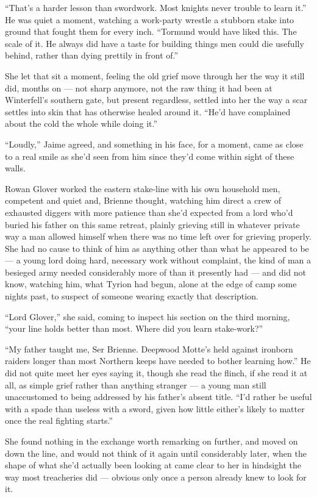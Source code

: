 “That’s a harder lesson than swordwork. Most knights never trouble to learn it.” He was quiet a moment, watching a work-party wrestle a stubborn stake into ground that fought them for every inch. “Tormund would have liked this. The scale of it. He always did have a taste for building things men could die usefully behind, rather than dying prettily in front of.”

She let that sit a moment, feeling the old grief move through her the way it still did, months on — not sharp anymore, not the raw thing it had been at Winterfell’s southern gate, but present regardless, settled into her the way a scar settles into skin that has otherwise healed around it. “He’d have complained about the cold the whole while doing it.”

“Loudly,” Jaime agreed, and something in his face, for a moment, came as close to a real smile as she’d seen from him since they’d come within sight of these walls.

\sceneBreak

Rowan Glover worked the eastern stake-line with his own household men, competent and quiet and, Brienne thought, watching him direct a crew of exhausted diggers with more patience than she’d expected from a lord who’d buried his father on this same retreat, plainly grieving still in whatever private way a man allowed himself when there was no time left over for grieving properly. She had no cause to think of him as anything other than what he appeared to be — a young lord doing hard, necessary work without complaint, the kind of man a besieged army needed considerably more of than it presently had — and did not know, watching him, what Tyrion had begun, alone at the edge of camp some nights past, to suspect of someone wearing exactly that description.

“Lord Glover,” she said, coming to inspect his section on the third morning, “your line holds better than most. Where did you learn stake-work?”

“My father taught me, Ser Brienne. Deepwood Motte’s held against ironborn raiders longer than most Northern keeps have needed to bother learning how.” He did not quite meet her eyes saying it, though she read the flinch, if she read it at all, as simple grief rather than anything stranger — a young man still unaccustomed to being addressed by his father’s absent title. “I’d rather be useful with a spade than useless with a sword, given how little either’s likely to matter once the real fighting starts.”

She found nothing in the exchange worth remarking on further, and moved on down the line, and would not think of it again until considerably later, when the shape of what she’d actually been looking at came clear to her in hindsight the way most treacheries did — obvious only once a person already knew to look for it.


